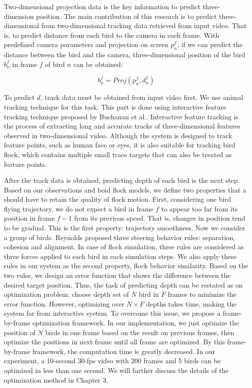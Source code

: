Two-dimensional projection data is the key information to predict three-dimension position. The main contribution of this research is to predict three-dimensional from two-dimensional tracking data retrieved from input video. That is, to predict distance from each bird to the camera in each frame. With predefined camera parameters and projection on screen $p_n^f$, if we can predict the distance between the bird and the camera, three-dimensional position of the bird $b_n^f$ in frame $f$ of bird $n$ can be obtained:


\begin{equation}\label{eq:projection}
 b_n^f=Proj(p_n^f,d_n^f)
\end{equation}


To predict $d$, track data must be obtained from input video first. We use animal tracking technique for this task. This part is done using interactive feature tracking technique proposed by Buchanan et al.\cite{Tracking}. Interactive feature tracking is the process of extracting long and accurate tracks of three-dimensional features observed in two-dimensional video. Although the system is designed to track feature points, such as human face or eyes, it is also suitable for tracking bird flock, which contains multiple small trace targets that can also be treated as feature points.



After the track data is obtained, predicting depth of each bird is the next step. Based on our observations and boid flock models, we define two properties that a should have to retain the quality of flock motion. First, considering one bird flying trajectory, we do not expect a bird in frame $f$ to appear too far from its position in frame $f-1$ from its previous speed. That is, changes in position tend to be gradual. This is the first property: trajectory smoothness. Now we consider a group of birds. Reynolds proposed three steering behavior rules: separation, cohesion and alignment\cite{Boid}. In case of flock simulation, three rules are considered as three forces applied to each bird in each simulation steps. We also apply these rules in our system as the second property, flock behavior similarity. Based on the two rules, we design an error function that shows the difference between the desired target position. Thus, the task of predicting depth can be restated as on optimization problem: choose depth set of $N$ bird in $F$ frames to minimize the error function. However, optimizing over $N×F$ depths takes time, making the system far from interactive system. To overcome this issue, we propose a frame-by-frame optimization framework. In our implementation, we just optimize the position of $N$ birds in one frame based on the result on previous frames, then optimize the positions in next frame until all frame are optimized. By this frame-by-frame framework, the computation time is greatly decreased. In our experiment, a 10-second 30-fps video with 200 frames and 5 birds can be optimized in less than one second. We will further discuss the details of the optimization method in Chapter 3.


